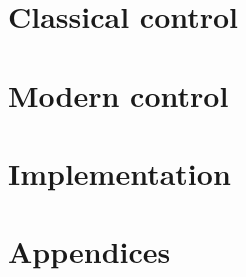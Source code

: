 \documentclass[11pt]{book}
\begin{document}
\frontmatter



\mainmatter

\part{Classical control}




\part{Modern control}





\part{Implementation}




\part{Appendices}
\appendix

\renewcommand{\chaptermark}[1]{\markboth{\sffamily\normalsize\bfseries\appendixname\ \thechapter.\ #1}{}}






\renewcommand{\chaptermark}[1]{\markboth{\sffamily\normalsize\bfseries #1}{}}

\end{document}
